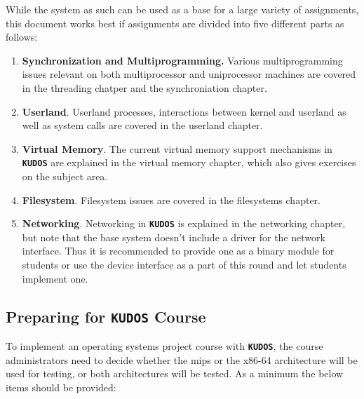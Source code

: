 \documentclass[twoside,a4paper]{report}
\newcommand{\kudos}{\texttt{\textbf{KUDOS}}}
\begin{document}
While the system as such can be used as a base for a large variety of
assignments, this document works best if assignments are
divided into five different parts as follows:

\begin{enumerate}

\item \textbf{Synchronization and Multiprogramming.} Various
multiprogramming issues relevant on both multiprocessor and
uniprocessor machines are covered in the threading chatper and
the synchroniation chapter.

\item \textbf{Userland}. Userland processes, interactions between
kernel and userland as well as system calls are covered in the 
userland chapter.

\item \textbf{Virtual Memory}. The current virtual memory support
mechanisms in \kudos{} are explained in the virtual memory chapter, 
which also gives exercises on the subject area.

\item \textbf{Filesystem}. Filesystem issues are covered in the 
filesystems chapter.

\item \textbf{Networking}. Networking in \kudos{} is explained in the
networking chapter, but note that the base system doesn't include a
driver for the network interface. Thus it is recommended to provide
one as a binary module for students or use the device interface as
a part of this round and let students implement one.

\end{enumerate}

\subsection{Preparing for \kudos{} Course}

To implement an operating systems project course with \kudos{}, the course
administrators need to decide whether the mips or the x86-64 architecture will
be used for testing, or both architectures will be tested. As a minimum the below
items should be provided:
\end{document}
